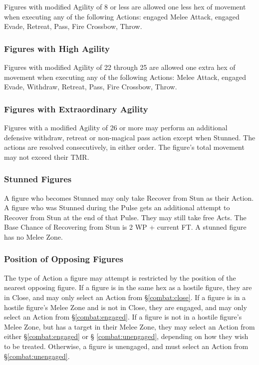 \begin{multicols*}{3}
Figures with modified Agility of 8 or less are allowed one less hex of
movement when executing any of the following Actions: engaged Melee
Attack, engaged Evade, Retreat, Pass, Fire Crossbow, Throw.

\subsubsection{Figures with High Agility}

Figures with modified Agility of 22 through 25 are allowed one extra
hex of movement when executing any of the following Actions: Melee
Attack, engaged Evade, Withdraw, Retreat, Pass, Fire Crossbow, Throw.

\subsubsection{Figures with Extraordinary Agility}

Figures with a modified Agility of 26 or more may perform an
additional defensive withdraw, retreat or non-magical pass action
except when Stunned. The actions are resolved consecutively, in either
order. The figure's total movement may not exceed their TMR.

\subsubsection{Stunned Figures}
\label{combat:stun}

A figure who becomes Stunned may only take Recover from Stun as their
Action.  A figure who was Stunned during the Pulse gets an additional
attempt to Recover from Stun at the end of that Pulse.  They may still
take free Acts.  The Base Chance of Recovering from Stun is 2 \x WP +
current FT.  A stunned figure has no Melee Zone.

\subsubsection{Position of Opposing Figures}

The type of Action a figure may attempt is restricted by the position
of the nearest opposing figure. If a figure is in the same hex as a
hostile figure, they are in Close, and may only select an Action from
\S \ref{combat:close}. If a figure is in a hostile figure's Melee Zone
and is not in Close, they are engaged, and may only select an Action
from \S \ref{combat:engaged}. If a figure is not in a hostile figure's
Melee Zone, but has a target in their Melee Zone, they may select an
Action from either \S \ref{combat:engaged} or \S
\ref{combat:unengaged}, depending on how they wish to be
treated. Otherwise, a figure is unengaged, and must select an Action
from \S \ref{combat:unengaged}.


\end{multicols*}
